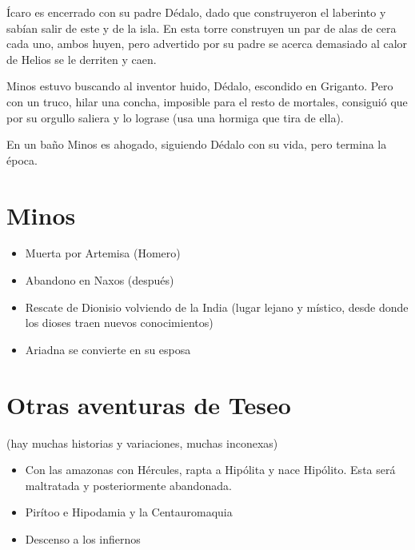 Ícaro es encerrado con su padre Dédalo, dado que construyeron el laberinto y sabían salir de este y de la isla. En esta torre construyen un par de alas de cera cada uno, ambos huyen, pero advertido por su padre se acerca demasiado al calor de Helios se le derriten y caen. 

Minos estuvo buscando al inventor huido, Dédalo, escondido en Griganto. Pero con un truco, hilar una concha, imposible para el resto de mortales, consiguió que por su orgullo saliera y lo lograse (usa una hormiga que tira de ella). 

En un baño Minos es ahogado, siguiendo Dédalo con su vida, pero termina la época.

\section{Minos}
\begin{itemize}
    \item Muerta por Artemisa (Homero)
    \item Abandono en Naxos (después)
    \item Rescate de Dionisio volviendo de la India (lugar lejano y místico, desde donde los dioses traen nuevos conocimientos)
    \item Ariadna se convierte en su esposa
\end{itemize}

\section{Otras aventuras de Teseo }
(hay muchas historias y variaciones, muchas inconexas)
\begin{itemize}
    \item Con las amazonas con Hércules, rapta a Hipólita y nace Hipólito. Esta será maltratada y posteriormente abandonada.
    \item Pirítoo e Hipodamia y la Centauromaquia
    \item Descenso a los infiernos
\end{itemize}
